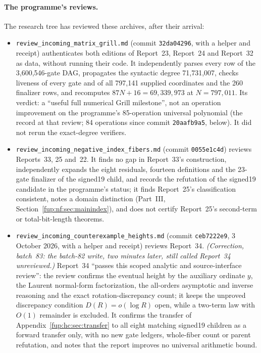 \documentclass[11pt,letterpaper]{article}
\theoremstyle{definition}\newtheorem{definition}[theorem]{Definition}
\theoremstyle{remark}\newtheorem{remark}[theorem]{Remark}
\newcommand{\rw}[1]{\nolinkurl{#1}}%
\begin{document}
\paragraph{The programme's reviews.} The research tree has reviewed these archives, after their arrival:
\begin{itemize}
\item \rw{review_incoming_matrix_grill.md} (commit \texttt{32da04296}, with a helper and receipt) authenticates both editions of Report~23, Report~24 and Report~32 as data, without running their code. It independently parses every row of the 3,600,546-gate DAG, propagates the syntactic degree 71,731,007, checks liveness of every gate and of all 797,141 supplied coordinates and the 260 finalizer rows, and recomputes $87N+16=69{,}339{,}973$ at $N=797{,}011$. Its verdict: a ``useful full numerical Grill milestone'', not an operation improvement on the programme's 85-operation universal polynomial (the record at that review; 84 operations since commit \texttt{20aafb9a5}, below). It did not rerun the exact-degree verifiers.
\item \rw{review_incoming_negative_index_fibers.md} (commit \texttt{0055e1c4d}) reviews Reports~33, 25 and~22. It finds no gap in Report~33's construction, independently expands the eight residuals, fourteen definitions and the 23-gate finalizer of the signed19 child, and records the refutation of the signed19 candidate in the programme's status; it finds Report~25's classification consistent, notes a domain distinction (Part~III, Section~\ref{fup:nf:sec:mainindex}), and does not certify Report~25's second-term or total-bit-length theorems.
\item \rw{review_incoming_counterexample_heights.md} (commit \texttt{ceb7222e9}, 3 October 2026, with a helper and receipt) reviews Report~34. \emph{(Correction, batch~83: the batch-82 write, two minutes later, still called Report~34 unreviewed.)} Report~34 ``passes this scoped analytic and source-interface review'': the review confirms the eventual height by the auxiliary ordinate $y$, the Laurent normal-form factorization, the all-orders asymptotic and inverse reasoning and the exact rotation-discrepancy count; it keeps the unproved discrepancy condition $D(R)=o(\log R)$ open, while a two-term law with $O(1)$ remainder is excluded. It confirms the transfer of Appendix~\ref{fup:hc:sec:transfer} to all eight matching signed19 children as a forward transfer only, with no new gate ledgers, whole-fiber count or parent refutation, and notes that the report improves no universal arithmetic bound.

\end{itemize}
\end{document}
